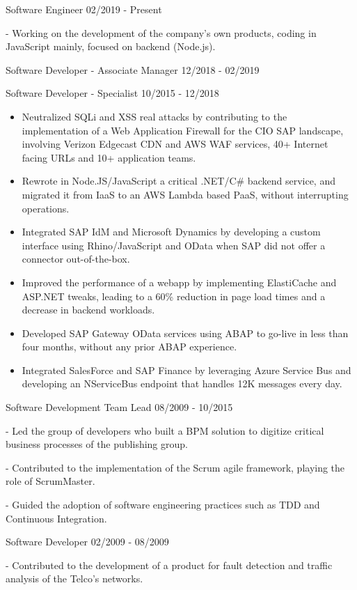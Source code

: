 \documentclass[11pt]{article} %
\begin{document}
\begin{description}
\squish
{}
           {Software Engineer}
           {02/2019 - Present}

- Working on the development of the company's own products, coding in JavaScript mainly, focused on backend (Node.js).

           {Software Developer - Associate Manager}
           {12/2018 - 02/2019}

           {Software Developer - Specialist}
           {10/2015 - 12/2018}

\begin{itemize}
\item Neutralized SQLi and XSS real attacks by contributing to the implementation of a Web Application Firewall for the CIO SAP landscape, involving Verizon Edgecast CDN and AWS WAF services, 40+ Internet facing URLs and 10+ application teams.
\item Rewrote in Node.JS/JavaScript a critical .NET/C\# backend service, and migrated it from IaaS to an AWS Lambda based PaaS, without interrupting operations.
\item Integrated SAP IdM and Microsoft Dynamics by developing a custom interface using Rhino/JavaScript and OData when SAP did not offer a connector out-of-the-box.
\item Improved the performance of a webapp by implementing ElastiCache and ASP.NET tweaks, leading to a 60\% reduction in page load times and a decrease in backend workloads.
\item Developed SAP Gateway OData services using ABAP to go-live in less than four months, without any prior ABAP experience.
\item Integrated SalesForce and SAP Finance by leveraging Azure Service Bus and developing an NServiceBus endpoint that handles 12K messages every day.
\end{itemize}

           {Software Development Team Lead}
           {08/2009 - 10/2015}

- Led the group of developers who built a BPM solution to digitize critical business processes of the publishing group.

- Contributed to the implementation of the Scrum agile framework, playing the role of ScrumMaster.

- Guided the adoption of software engineering practices such as TDD and Continuous Integration.

           {Software Developer}
           {02/2009 - 08/2009}

- Contributed to the development of a product for fault detection and traffic analysis of the Telco's networks.

\end{description}
\end{document}
